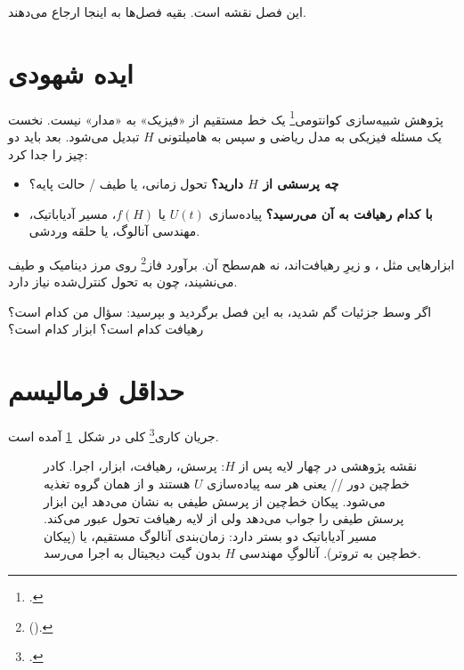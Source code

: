 این فصل نقشه است. بقیه فصل‌ها به اینجا ارجاع می‌دهند.

\section{ایده شهودی}

پژوهش شبیه‌سازی کوانتومی\footnote{.} یک خط مستقیم از «فیزیک» به «مدار» نیست. نخست یک مسئله فیزیکی به مدل ریاضی و سپس به هامیلتونی $H$ تبدیل می‌شود. بعد باید دو چیز را جدا کرد:
\begin{itemize}
	\item \textbf{چه پرسشی از $H$ دارید؟} تحول زمانی، یا طیف / حالت پایه؟
	\item \textbf{با کدام رهیافت به آن می‌رسید؟} پیاده‌سازی $U(t)$ یا $f(H)$، مسیر آدیاباتیک، مهندسی آنالوگ، یا حلقه وردشی.
\end{itemize}
ابزارهایی مثل ،  و  زیرِ رهیافت‌اند، نه هم‌سطح آن. برآورد فاز\footnote{ ().} روی مرز دینامیک و طیف می‌نشیند، چون به تحول کنترل‌شده نیاز دارد.

اگر وسط جزئیات گم شدید، به این فصل برگردید و بپرسید: سؤال من کدام است؟ رهیافت کدام است؟ ابزار کدام است؟

\section{حداقل فرمالیسم}

جریان کاری\footnote{.} کلی در شکل~\ref{fig:research-map} آمده است.

\begin{figure}[htbp]
	\centering
	\begin{latin}
			\resizebox{\ifdim\width>\textwidth\textwidth\else\width\fi}{!}{%
				}
		\end{latin}
	\caption{نقشه پژوهشی در چهار لایه پس از $H$: پرسش، رهیافت، ابزار، اجرا. کادر خط‌چین دور // یعنی هر سه پیاده‌سازی $U$ هستند و  از همان گروه تغذیه می‌شود. پیکان خط‌چین از پرسش طیفی به  نشان می‌دهد این ابزار پرسش طیفی را جواب می‌دهد ولی از لایه رهیافت تحول عبور می‌کند. مسیر آدیاباتیک دو بستر دارد: زمان‌بندی آنالوگ مستقیم، یا  (پیکان خط‌چین به تروتر). آنالوگِ مهندسی $H$ بدون گیت دیجیتال به اجرا می‌رسد.}
	\label{fig:research-map}
\end{figure}

